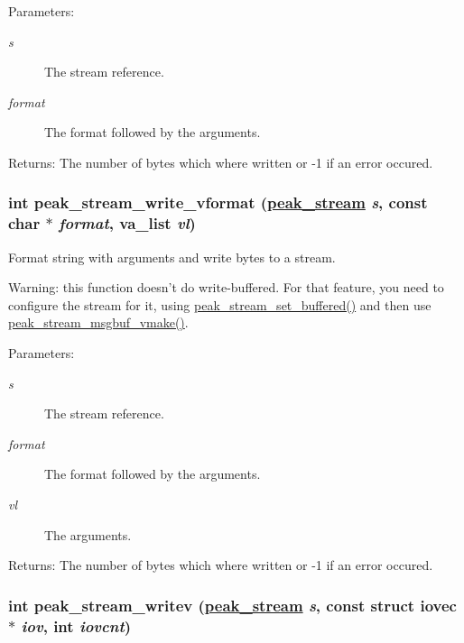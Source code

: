 \begin{Desc}
\item[Parameters:]
\begin{description}
\item[{\em s}]The stream reference. \item[{\em format}]The format followed by the arguments.\end{description}
\end{Desc}
\begin{Desc}
\item[Returns:]The number of bytes which where written or -1 if an error occured. \end{Desc}
\hypertarget{group__stream__low_ga4}{
\subsubsection[peak\_\-stream\_\-write\_\-vformat]{\setlength{\rightskip}{0pt plus 5cm}int peak\_\-stream\_\-write\_\-vformat (\hyperlink{group__stream_ga0}{peak\_\-stream} {\em s}, const char $\ast$ {\em format}, va\_\-list {\em vl})}}
\label{group__stream__low_ga4}


Format string with arguments and write bytes to a stream. 

Warning: this function doesn't do write-buffered. For that feature, you need to configure the stream for it, using \hyperlink{group__stream__buf_ga54}{peak\_\-stream\_\-set\_\-buffered()} and then use \hyperlink{group__stream__buf_ga60}{peak\_\-stream\_\-msgbuf\_\-vmake()}.

\begin{Desc}
\item[Parameters:]
\begin{description}
\item[{\em s}]The stream reference. \item[{\em format}]The format followed by the arguments. \item[{\em vl}]The arguments.\end{description}
\end{Desc}
\begin{Desc}
\item[Returns:]The number of bytes which where written or -1 if an error occured. \end{Desc}
\hypertarget{group__stream__low_ga5}{
\subsubsection[peak\_\-stream\_\-writev]{\setlength{\rightskip}{0pt plus 5cm}int peak\_\-stream\_\-writev (\hyperlink{group__stream_ga0}{peak\_\-stream} {\em s}, const struct iovec $\ast$ {\em iov}, int {\em iovcnt})}}
\label{group__stream__low_ga5}


